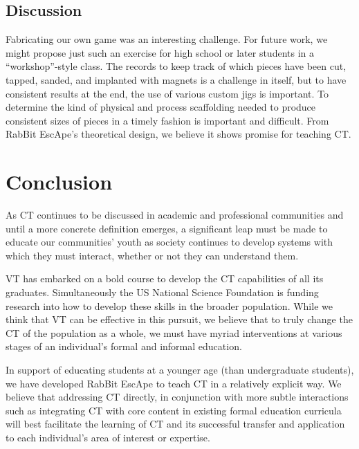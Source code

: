 \documentclass{acm_proc_article-sp}
\begin{document}
\subsection{Discussion}
\label{sec:discussion}
Fabricating our own game was an interesting challenge. For future work, we might propose just such an exercise for high school or later students in a ``workshop''-style class.
The records to keep track of which pieces have been cut, tapped, sanded, and implanted with magnets is a challenge in itself, but to have consistent results at the end, the use of various custom jigs is important.
To determine the kind of physical and process scaffolding needed to produce consistent sizes of pieces in a timely fashion is important and difficult. 
From RabBit EscApe's theoretical design, we believe it shows promise for teaching CT.

\section{Conclusion}
\label{sec:conclusion}
As CT continues to be discussed in academic and professional communities and until a more concrete definition emerges, a significant leap must be made to educate our communities' youth as society continues to develop systems with which they must interact, whether or not they can understand them. 

VT has embarked on a bold course to develop the CT capabilities of all its graduates.
Simultaneously the US National Science Foundation is funding research into how to develop these skills in the broader population.
While we think that VT can be effective in this pursuit, we believe that to truly change the CT of the population as a whole, we must have myriad interventions at various stages of an individual's formal and informal education.

In support of educating students at a younger age (than undergraduate students), we have developed RabBit EscApe to teach CT in a relatively explicit way.
We believe that addressing CT directly, in conjunction with more subtle interactions such as integrating CT with core content in existing formal education curricula\cite{NSFCE21} will best facilitate the learning of CT and its successful transfer and application to each individual's area of interest or expertise.
\end{document}
